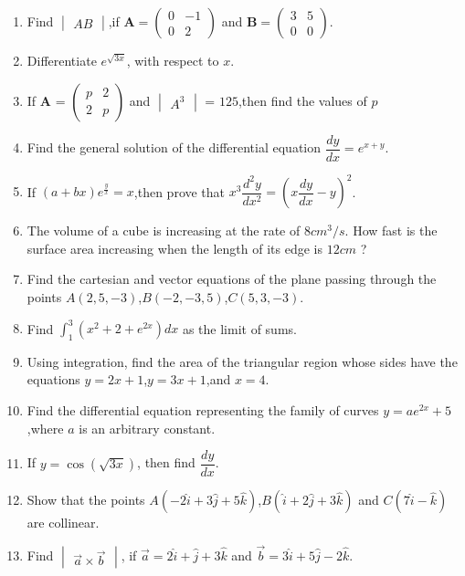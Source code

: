\documentclass[12pt,-letter paper]{article}
\providecommand{\brak}[1]{\ensuremath{\left(#1\right)}}
\theoremstyle{remark}
\newcommand{\myvec}[1]{\ensuremath{\begin{pmatrix}#1\end{pmatrix}}}
\newcommand{\mydet}[1]{\ensuremath{\begin{vmatrix}#1\end{vmatrix}}}
\let\vec\mathbf
\begin{document}
\begin{enumerate}
\item Find $\mydet{AB}$,if $\vec{A}=\myvec{0&-1 \\ 0&2}$ and $\vec{B}=\myvec{3&5 \\ 0&0}$.

\item Differentiate $e^{\sqrt{3x}}$, with respect to ${x}$.

\item If $\vec{A}$ = $\myvec{p&2 \\ 2&p}$ and $\mydet{A^3}$ = $125$,then find the values of $p$

\item Find the general solution of the differential equation $\dfrac{dy}{dx} = e^{x+y}$.

\item If $\brak{a+bx}e^\frac{y}{x}={x}$,then prove that ${x}^3\dfrac{d^2y}{dx^2}={\brak{x\dfrac{dy}{dx}-{y}}^2}$.

\item The volume of a cube is increasing at the rate of $8 cm^3/s$. How fast is the surface area increasing when the length of its edge is $12 cm$ ?

\item Find the cartesian and vector equations of the plane passing through the points $A$\brak{2,5,-3},$B$\brak{-2,-3,5},$C$\brak{5,3,-3}.

\item Find $\int_{1}^{3}{\brak{x^2+2+e^{2x}}}dx$ as the limit of sums.

\item Using integration, find the area of the triangular region whose sides have the equations ${y}={2x}+1$,${y}={3x}+1$,and ${x}=4$.
         
\item Find the differential equation representing the family of curves ${y}=ae^{2x}+5$,where $a$ is an arbitrary constant.

\item If ${y}=\cos\brak{\sqrt{3x}}$, then find $\dfrac{dy}{dx}$.

 \item Show that the points $A\brak{-2\hat{i}+3\hat{j}+5\hat{k}}$,$B\brak{\hat{i}+2\hat{j}+3\hat{k}}$ and $C\brak{7\hat{i}-\hat{k}}$ are collinear.
 
 \item Find $\mydet{\overrightarrow{a}\times\overrightarrow{b}}$, if $\overrightarrow{a}=2\hat{i}+\hat{j}+3\hat{k}$ and $\overrightarrow{b}=3\hat{i}+5\hat{j}-2\hat{k}$.
 

\end{enumerate}
\end{document}
